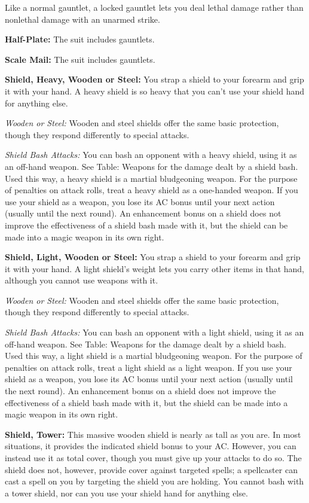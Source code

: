 \documentclass{article}
\begin{document}
Like a normal gauntlet, a locked gauntlet lets you deal lethal damage rather than 
nonlethal damage with an unarmed strike.

\textbf{Half-Plate:} The suit includes gauntlets.

\textbf{Scale Mail:} The suit includes gauntlets.

\textbf{Shield, Heavy, Wooden or Steel:} You strap a shield to your forearm and 
grip it with your hand. A heavy shield is so heavy that you can't use your shield 
hand for anything else.

\textit{Wooden or Steel: }Wooden and steel shields offer the same basic protection, 
though they respond differently to special attacks.

\textit{Shield Bash Attacks: }You can bash an opponent with a heavy shield, using 
it as an off-hand weapon. See Table: Weapons for the damage dealt by a shield bash. 
Used this way, a heavy shield is a martial bludgeoning weapon. For the purpose 
of penalties on attack rolls, treat a heavy shield as a one-handed weapon. If you 
use your shield as a weapon, you lose its AC bonus until your next action (usually 
until the next round). An enhancement bonus on a shield does not improve the effectiveness 
of a shield bash made with it, but the shield can be made into a magic weapon in 
its own right.

\textbf{Shield, Light, Wooden or Steel:} You strap a shield to your forearm and 
grip it with your hand. A light shield's weight lets you carry other items in that 
hand, although you cannot use weapons with it.

\textit{Wooden or Steel: }Wooden and steel shields offer the same basic protection, 
though they respond differently to special attacks.

\textit{Shield Bash Attacks: }You can bash an opponent with a light shield, using 
it as an off-hand weapon. See Table: Weapons for the damage dealt by a shield bash. 
Used this way, a light shield is a martial bludgeoning weapon. For the purpose 
of penalties on attack rolls, treat a light shield as a light weapon. If you use 
your shield as a weapon, you lose its AC bonus until your next action (usually 
until the next round). An enhancement bonus on a shield does not improve the effectiveness 
of a shield bash made with it, but the shield can be made into a magic weapon in 
its own right.

\textbf{Shield, Tower:} This massive wooden shield is nearly as tall as you are. 
In most situations, it provides the indicated shield bonus to your AC. However, 
you can instead use it as total cover, though you must give up your attacks to 
do so. The shield does not, however, provide cover against targeted spells; a spellcaster 
can cast a spell on you by targeting the shield you are holding. You cannot bash 
with a tower shield, nor can you use your shield hand for anything else.
\end{document}

